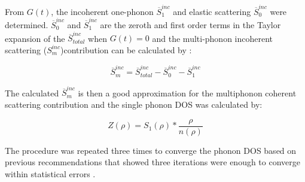 \noindent From $G(t)$, the incoherent one-phonon $\overline{S}_{1}^{inc}$ and elastic scattering $\overline{S}_{0}^{inc}$ were determined.  $\overline{S}_{0}^{inc}$ and $\overline{S}_{1}^{inc}$ are the zeroth and first order terms in the Taylor expansion of the $\overline{S}_{total}^{inc}$ when $G(t)=0$ and the multi-phonon incoherent scattering ($S_{m}^{inc}$)contribution can be calculated by \cite{Manley2001,Manley2002}:

\begin{equation}
\label{eq: S_inco}
\overline{S}_{m}^{inc} = \overline{S}_{total}^{inc}-\overline{S}_{0}^{inc}-\overline{S}_{1}^{inc}
\end{equation}

\noindent The calculated $\overline{S}_{m}^{inc}$ is then a good approximation for the multiphonon coherent scattering contribution and the single phonon DOS was calculated by:

\begin{equation}
\label{eq: onephonon}
Z(\rho) = S_{1}(\rho)* \frac{\rho}{n(\rho)}
\end{equation}

\noindent The procedure was repeated three times to converge the phonon DOS based on previous recommendations that showed three iterations were enough to converge within statistical errors \cite{Manley2001,Manley2002}.